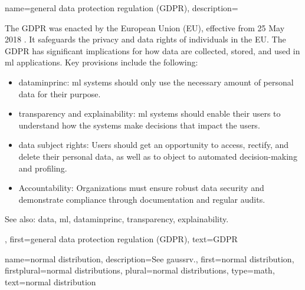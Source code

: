 {name={general data protection regulation (GDPR)},
	description={The GDPR
			was enacted by the European Union (EU), effective from 25 May 2018 \cite{GDPR2016}. 
			It safeguards the privacy and \gls{data} rights of individuals in the EU. 
			The GDPR has significant implications for how \gls{data} are collected, stored, 
			and used in \gls{ml} applications. Key provisions include the following:
			\begin{itemize}
				\item \Gls{dataminprinc}: \gls{ml} systems should only use the necessary 
				amount of personal 
				\gls{data} for their purpose.
				\item \Gls{transparency} and \gls{explainability}: \gls{ml} systems should 
				enable their users to 
				understand how the systems make decisions that impact the users.
				\item \Gls{data} subject rights: Users should get an opportunity to access, 
				rectify, and delete their personal \gls{data}, as well as to object to automated 
				decision-making and profiling.
				\item Accountability: Organizations must ensure robust \gls{data} security 
				and demonstrate compliance through documentation and regular audits.
			\end{itemize}
		See also: \gls{data}, \gls{ml}, \gls{dataminprinc}, \gls{transparency}, \gls{explainability}.}, 
	first={general data protection regulation (GDPR)},
	text={GDPR}
}

{name={normal distribution}, 
 description={See \gls{gaussrv}.},
 first={normal distribution}, 
 firstplural={normal distributions},
 plural={normal distributions},
 type=math, 
 text={normal distribution}
}
	
